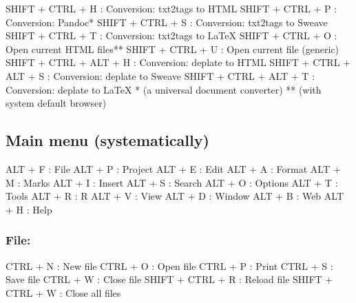 \vspace{-0.5cm}
\begin{Rtables}[caption={[Conversion and visualization keyboard shortcuts]
    Conversion and visualization keyboard shortcuts},
  label=hotkey:conversion]
  SHIFT + CTRL + H       : Conversion: txt2tags to HTML
  SHIFT + CTRL + P       : Conversion: Pandoc*
  SHIFT + CTRL + S       : Conversion: txt2tags to Sweave
  SHIFT + CTRL + T       : Conversion: txt2tags to LaTeX
  SHIFT + CTRL + O       : Open current HTML files**
  SHIFT + CTRL + U       : Open current file (generic)
  SHIFT + CTRL + ALT + H : Conversion: deplate to HTML
  SHIFT + CTRL + ALT + S : Conversion: deplate to Sweave
  SHIFT + CTRL + ALT + T : Conversion: deplate to LaTeX
  *  (a universal document converter)
  ** (with system default browser)
\end{Rtables}


\newpage
\hypertarget{basic_card_mainmenu}{}
\subsection{Main menu (systematically)}

\vspace{-0.5cm}
\begin{Rtables}[caption={[Main menu keyboard shortcuts]
    Main Menu keyboard shortcuts},
  label=menu:main]
  ALT + F                 : File
  ALT + P                 : Project
  ALT + E                 : Edit
  ALT + A                 : Format
  ALT + M                 : Marks
  ALT + I                 : Insert
  ALT + S                 : Search
  ALT + O                 : Options
  ALT + T                 : Tools
  ALT + R                 : R
  ALT + V                 : View
  ALT + D                 : Window
  ALT + B                 : Web
  ALT + H                 : Help
\end{Rtables}


\subsubsection{File:}

\vspace{-0.5cm}
\begin{Rtables}[caption={[File menu keyboard shortcuts]
    File menu keyboard shortcuts},
  label=menu:file]
  CTRL  + N               : New file
  CTRL  + O               : Open file
  CTRL  + P               : Print
  CTRL  + S               : Save file
  CTRL  + W               : Close file
  SHIFT + CTRL + R        : Reload file
  SHIFT + CTRL + W        : Close all files
\end{Rtables}



